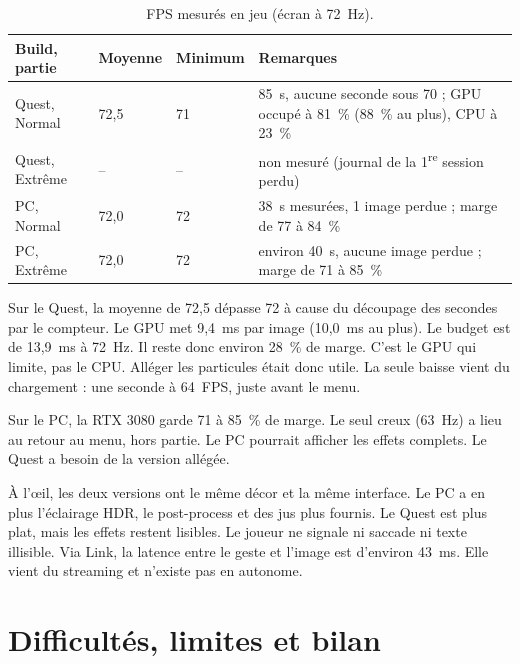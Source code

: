 \documentclass[11pt,a4paper]{article}
\begin{document}
\begin{table}[!htb]
\centering\small
\caption{FPS mesurés en jeu (écran à 72~Hz).}
\begin{tabularx}{\textwidth}{@{}P{2.5cm}P{1.6cm}P{1.7cm}L@{}}
\toprule
Build, partie & Moyenne & Minimum & Remarques \\
\midrule
Quest, Normal & 72,5 & 71 & 85~s, aucune seconde sous 70 ; GPU occupé à 81~\% (88~\% au plus), CPU à 23~\% \\
Quest, Extrême & -- & -- & non mesuré (journal de la 1\textsuperscript{re} session perdu) \\
PC, Normal & 72,0 & 72 & 38~s mesurées, 1 image perdue ; marge de 77 à 84~\% \\
PC, Extrême & 72,0 & 72 & environ 40~s, aucune image perdue ; marge de 71 à 85~\% \\
\bottomrule
\end{tabularx}
\end{table}

Sur le Quest, la moyenne de 72,5 dépasse 72 à cause du découpage des secondes par le compteur. Le GPU
met 9,4~ms par image (10,0~ms au plus). Le budget est de 13,9~ms à 72~Hz. Il reste donc environ
28~\% de marge. C'est le GPU qui limite, pas le CPU. Alléger les particules était donc utile. La seule
baisse vient du chargement : une seconde à 64~FPS, juste avant le menu.

Sur le PC, la RTX 3080 garde 71 à 85~\% de marge. Le seul creux (63~Hz) a lieu au retour au menu,
hors partie. Le PC pourrait afficher les effets complets. Le Quest a besoin de la version allégée.

À l'œil, les deux versions ont le même décor et la même interface. Le PC a en plus l'éclairage HDR, le
post-process et des jus plus fournis. Le Quest est plus plat, mais les effets restent lisibles. Le
joueur ne signale ni saccade ni texte illisible. Via Link, la latence entre le geste et l'image est
d'environ 43~ms. Elle vient du streaming et n'existe pas en autonome.

\section{Difficultés, limites et bilan}
\end{document}
